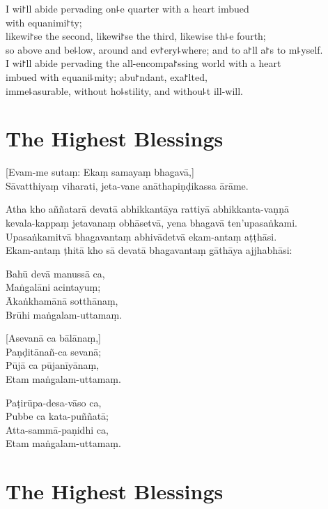 \clearpage

I wi꜓ll abide pervading on꜕e quarter with a heart imbued\\%
\vin with equanimi꜓ty;\\
likewi꜓se the second, likewi꜓se the third, likewise th꜕e fourth;\\
so above and be꜕low, around and ev꜓ery꜕where; and to a꜓ll a꜓s to m꜕yself.\\
I wi꜓ll abide pervading the all-encompa꜓ssing world with a heart \\
imbued with equani꜕mity; abu꜓ndant, exa꜓lted,\\
\vin imme꜕asurable, without ho꜕stility, and withou꜕t ill-will.

\chapter{The Highest Blessings}%

\begin{leader}
\end{leader}

[Evam-me sutaṃ: Ekaṃ samayaṃ bhagavā,]\\
Sāvatthiyaṃ viharati, jeta-vane anāthapiṇḍikassa ārāme.

Atha kho aññatarā devatā abhikkantāya rattiyā abhikkanta-vaṇṇā\\
kevala-kappaṃ jetavanaṃ obhāsetvā, yena bhagavā ten’upasaṅkami.\\
Upasaṅkamitvā bhagavantaṃ abhivādetvā ekam-antaṃ aṭṭhāsi.\\
Ekam-antaṃ ṭhitā kho sā devatā bhagavantaṃ gāthāya ajjhabhāsi:

Bahū devā manussā ca,\\
Maṅgalāni acintayuṃ;\\
Ākaṅkhamānā sotthānaṃ,\\
Brūhi maṅgalam-uttamaṃ.

[Asevanā ca bālānaṃ,]\\
Paṇḍitānañ-ca sevanā;\\
Pūjā ca pūjanīyānaṃ,\\
Etam maṅgalam-uttamaṃ.

Paṭirūpa-desa-vāso ca,\\
Pubbe ca kata-puññatā;\\
Atta-sammā-paṇidhi ca,\\
Etam maṅgalam-uttamaṃ.

\chapter{The Highest Blessings}%

